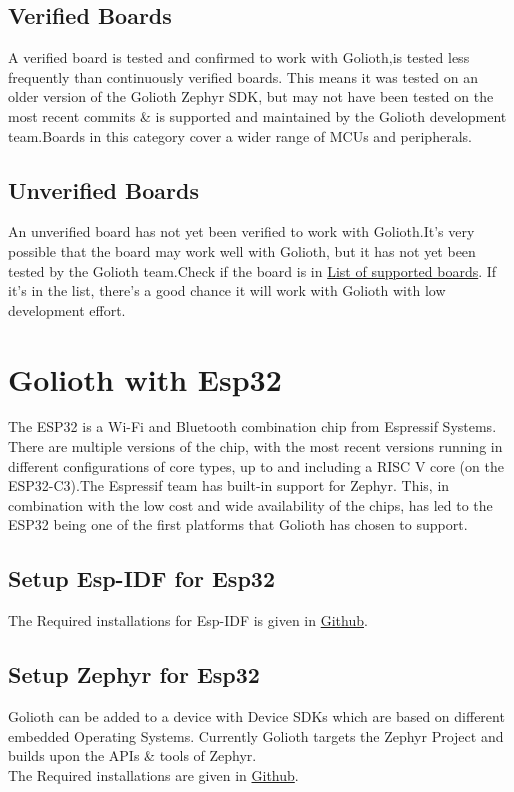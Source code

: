 \documentclass[journal,5pt,twocolumn]{IEEEtran}
\begin{document}
\subsection{\textbf{Verified Boards}}
\raggedright A verified board is tested and confirmed to work with Golioth,is tested less frequently than continuously verified boards. 
This means it was tested on an older version of the Golioth Zephyr SDK, but may not have been tested on the most recent commits \& is supported and maintained by the Golioth development team.Boards in this category cover a wider range of MCUs and peripherals.
\subsection{\textbf{Unverified Boards}}
\raggedright An unverified board has not yet been verified to work with Golioth.It's very possible that the board may work well with Golioth, but it has not yet been tested by the Golioth team.Check if the board is in {\href{https://docs.zephyrproject.org/latest/boards/index.html}{List of supported boards}}. If it's in the list, there's a good chance it will work with Golioth with low development effort.
\section{\textbf{Golioth with Esp32}}
\raggedright The ESP32 is a Wi-Fi and Bluetooth combination chip from Espressif Systems. There are multiple versions of the chip, with the most recent versions running in different configurations of core types, up to and including a RISC V core (on the ESP32-C3).The Espressif team has built-in support for Zephyr. This, in combination with the low cost and wide availability of the chips, has led to the ESP32 being one of the first platforms that Golioth has chosen to support.
\subsection{\textbf{Setup Esp-IDF for Esp32}}
The Required installations for Esp-IDF is given in {\href{https://github.com/KrishnaYadati/Golioth-PSoC/blob/main/docs/esp-idf_installation.txt}{Github}}.
\subsection{\textbf{Setup Zephyr for Esp32}}
Golioth can be added to a device with Device SDKs which are based on different embedded Operating Systems. Currently Golioth targets the Zephyr Project and builds upon the APIs \& tools of Zephyr.\\
The Required installations are given in {\href{https://github.com/KrishnaYadati/Golioth-PSoC/blob/main/docs/zephyr-esp32_installation.txt}{Github}}.
\end{document}
